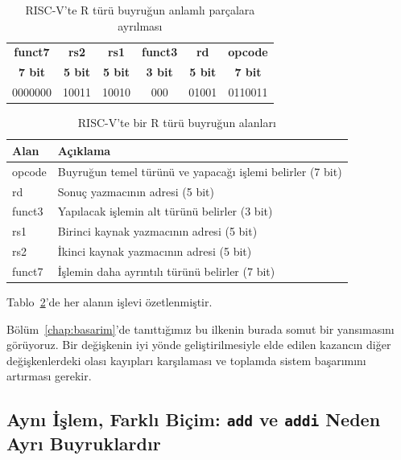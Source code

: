 \begin{table}[H]
\centering
\caption{RISC-V'te R türü buyruğun anlamlı parçalara ayrılması}
\label{tab:buyruk-parcalari}
\begin{tabular}{cccccc}
\toprule
\textbf{funct7} & \textbf{rs2} & \textbf{rs1} & \textbf{funct3} & \textbf{rd} & \textbf{opcode} \\
\textbf{7 bit} & \textbf{5 bit} & \textbf{5 bit} & \textbf{3 bit} & \textbf{5 bit} & \textbf{7 bit} \\
\midrule
0000000 & 10011 & 10010 & 000 & 01001 & 0110011 \\
\bottomrule
\end{tabular}
\end{table}

\begin{table}[H]
\centering
\caption{RISC-V'te bir R türü buyruğun alanları}
\label{tab:buyruk-alanlari}
\begin{tabular}{lp{10cm}}
\toprule
\textbf{Alan} & \textbf{Açıklama} \\
\midrule
opcode & Buyruğun temel türünü ve yapacağı işlemi belirler (7 bit) \\
rd     & Sonuç yazmacının adresi (5 bit) \\
funct3 & Yapılacak işlemin alt türünü belirler (3 bit) \\
rs1    & Birinci kaynak yazmacının adresi (5 bit) \\
rs2    & İkinci kaynak yazmacının adresi (5 bit) \\
funct7 & İşlemin daha ayrıntılı türünü belirler (7 bit) \\
\bottomrule
\end{tabular}
\end{table}

Tablo~\ref{tab:buyruk-alanlari}'de her alanın işlevi özetlenmiştir.

\begin{tanim}
Bölüm~\ref{chap:basarim}'de tanıttığımız bu ilkenin burada somut bir yansımasını görüyoruz. Bir değişkenin iyi yönde geliştirilmesiyle elde edilen kazancın diğer değişkenlerdeki olası kayıpları karşılaması ve toplamda sistem başarımını artırması gerekir.
\end{tanim}

\subsection{Aynı İşlem, Farklı Biçim: \texttt{add} ve \texttt{addi} Neden Ayrı Buyruklardır}

